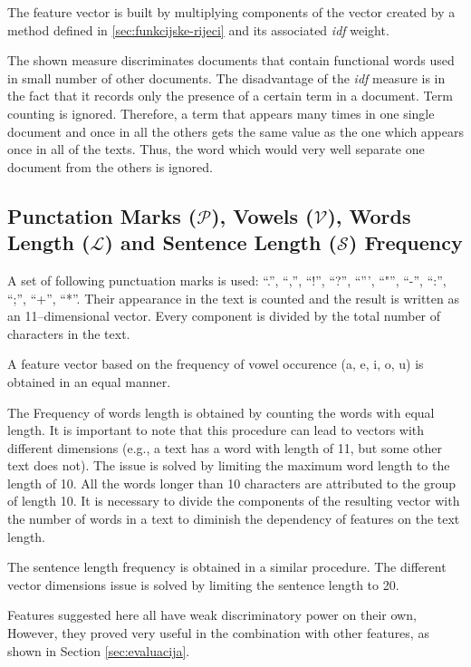 \documentclass{llncs}
\begin{document}
The feature vector is built by multiplying components of the vector created by a method
defined in \ref{sec:funkcijske-rijeci} and its associated \emph{idf} weight.

The shown measure discriminates documents that contain functional words used in small 
number of other documents. The disadvantage of the \emph{idf} measure is
in the fact that it records only the presence of a certain term in a document. Term
counting is ignored. Therefore, a term that appears many times in
one single document and once in all the others gets the same value as the one which appears
once in all of the texts. Thus, the word which would very well separate one document from the
others is ignored.

\subsection{Punctation Marks ($\mathcal{P}$), Vowels ($\mathcal{V}$), Words
Length ($\mathcal{L}$) and Sentence Length ($\mathcal{S}$) Frequency}
\label{sec:znacajke-manje}
A set of following punctuation marks is used: ``.'', ``,'', ``!'', ``?'',
``''', ``"'', ``-'', ``:'', ``;'', ``+'', ``*''. Their appearance in the text is counted and
the result is written as an 11--dimensional vector. Every
component is divided by the total number of characters in the text. 

A feature vector based on the frequency of vowel occurence (a, e, i, o, u) is
obtained in an equal manner.

The Frequency of words length is obtained by counting the words with equal
length. It is important to note that this procedure can lead to vectors with different dimensions
(e.g., a text has a word with length of 11, but some other text does not). 
The issue is solved by limiting the maximum word length to the length of 10. 
All the words longer than 10 characters are attributed to the group of length 10. 
It is necessary to divide the components of the resulting vector 
with the number of words in a text to diminish the dependency of features on the text 
length. 

The sentence length frequency is obtained in a similar procedure.
The different vector dimensions issue is solved by limiting the sentence length to 20.

Features suggested here all have weak discriminatory power on their own, However, they proved 
very useful in the combination with other features, as shown in Section \ref{sec:evaluacija}.
\end{document}
